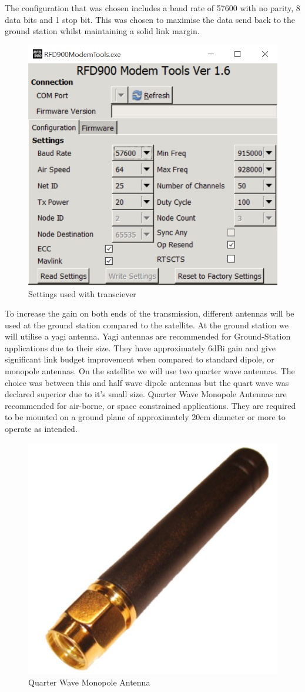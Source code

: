 \noindent
The configuration that was chosen includes a baud rate of 57600 with no parity, 8 data bits and 1 stop bit. This was chosen to maximise the data send back to the ground station whilst maintaining a solid link margin.
\begin{figure}[H]
    \centering
    \includegraphics[width=0.75\linewidth]{./figures/rfd2}
    \caption{Settings used with transciever}
\end{figure}
\noindent
To increase the gain on both ends of the transmission, different antennas will be used at the ground station compared to the satellite. At the ground station we will utilise a yagi antenna. Yagi antennas are recommended for Ground-Station applications due to their size. They have approximately 6dBi gain and give significant link budget improvement when compared to standard dipole, or monopole antennas. 
\noindent
On the satellite we will use two quarter wave antennas. The choice was between this and half wave dipole antennas but the quart wave was declared superior due to it’s small size. Quarter Wave Monopole Antennas are recommended for air-borne, or space constrained applications. They are required to be mounted on a ground plane of approximately 20cm diameter or more to operate as intended.
\begin{figure}[H]
    \centering
    \includegraphics[width=0.6\linewidth]{./figures/antennae}
    \caption{Quarter Wave Monopole Antenna}
\end{figure}

